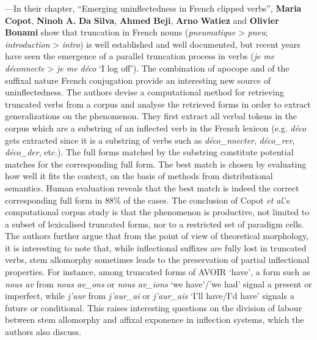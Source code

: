 \documentclass[output=paper]{langscibook}
\begin{document}
—In their chapter, “Emerging uninflectedness in French clipped verbs”,  \textbf{Maria} \textbf{Copot}, \textbf{Ninoh} \textbf{A.} \textbf{Da} \textbf{Silva}, \textbf{Ahmed} \textbf{Beji}, \textbf{Arno} \textbf{Watiez} and \textbf{Olivier} \textbf{Bonami} show that truncation in French nouns (\textit{pneumatique} > \textit{pneu}; \textit{introduction} > \textit{intro}) is well established and well documented, but recent years have seen the emergence of a parallel truncation process in verbs (\textit{je me déconnecte} > \textit{je me déco} ‘I log off’). The combination of apocope and of the suffixal nature French conjugation provide an interesting new source of uninflectedness. The authors devise a computational method for retrieving truncated verbs from a corpus and analyse the retrieved forms in order to extract generalizations on the phenomenon. They first extract all verbal tokens in the corpus which are a substring of an inflected verb in the French lexicon (e.g. \textit{déco} gets extracted since it is a substring of verbs such as \textit{déco\_nnecter}, \textit{déco\_rer}, \textit{déco\_der}, etc.). The full forms matched by the substring constitute potential matches for the corresponding full form. The best match is chosen by evaluating how well it fits the context, on the basis of methods from distributional semantics. Human evaluation reveals that the best match is indeed the correct corresponding full form in 88\% of the cases. The conclusion of Copot \textit{et al}.’s computational corpus study is that the phenomenon is productive, not limited to a subset of lexicalised truncated forms, nor to a restricted set of paradigm cells. The authors further argue that from the point of view of theoretical morphology, it is interesting to note that, while inflectional suffixes are fully lost in truncated verbs, stem allomorphy sometimes leads to the preservation of partial inflectional properties. For instance, among truncated forms of AVOIR ‘have’, a form such as \textit{nous av} from \textit{nous av\-\_ons} or \textit{nous av\_ions} ‘we have’/’we had' signal a present or imperfect, while \textit{j’aur} from \textit{j’aur\_ai} or \textit{j’aur\_ais} ‘I’ll have/I’d have’ signals a future or conditional. This raises interesting questions on the division of labour between stem allomorphy and affixal exponence in inflection systems, which the authors also discuss.
\end{document}
